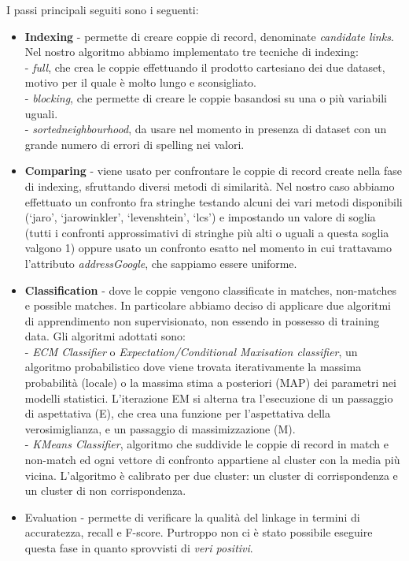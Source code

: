 \documentclass[a4paper,12pt]{article}
\begin{document}
I passi principali seguiti sono i seguenti:
\begin{itemize}
\item \textbf{Indexing} - permette di creare coppie di record, denominate \textit{candidate links}. Nel nostro algoritmo abbiamo implementato tre tecniche di indexing: \\
- \textit{full}, che crea le coppie effettuando il prodotto cartesiano dei due dataset, motivo per il quale è molto lungo e sconsigliato. \\
- \textit{blocking}, che permette di creare le coppie basandosi su una o più variabili uguali. \\
- \textit{sortedneighbourhood}, da usare nel momento in presenza di dataset con un grande numero di errori di spelling nei valori.
\item \textbf{Comparing} - viene usato per confrontare le coppie di record create nella fase di indexing, sfruttando diversi metodi di similarità. Nel nostro caso abbiamo effettuato un confronto fra stringhe testando alcuni dei vari metodi disponibili (‘jaro’, ‘jarowinkler’, ‘levenshtein’, ‘lcs’) e impostando un valore di soglia (tutti i confronti approssimativi di stringhe più alti o uguali a questa soglia valgono 1) oppure usato un confronto esatto nel momento in cui trattavamo l'attributo \textit{addressGoogle}, che sappiamo essere uniforme.
\item \textbf{Classification} - dove le coppie vengono classificate in matches, non-matches e possible matches. In particolare abbiamo deciso di applicare due algoritmi di apprendimento non supervisionato, non essendo in possesso di training data. Gli algoritmi adottati sono: \\
- \textit{ECM Classifier} o \textit{Expectation/Conditional Maxisation classifier}, un algoritmo probabilistico dove viene trovata iterativamente la massima probabilità (locale) o la massima stima a posteriori (MAP) dei parametri nei modelli statistici. L'iterazione EM si alterna tra l'esecuzione di un passaggio di aspettativa (E), che crea una funzione per l'aspettativa della verosimiglianza, e un passaggio di massimizzazione (M). \\
- \textit{KMeans Classifier}, algoritmo che suddivide le coppie di record in match e non-match ed ogni vettore di confronto appartiene al cluster con la media più vicina. L'algoritmo è calibrato per due cluster: un cluster di corrispondenza e un cluster di non corrispondenza.
\item {Evaluation} - permette di verificare la qualità del linkage in termini di accuratezza, recall e F-score. Purtroppo non ci è stato possibile eseguire questa fase in quanto sprovvisti di \textit{veri positivi}.
\end{itemize}
\end{document}
